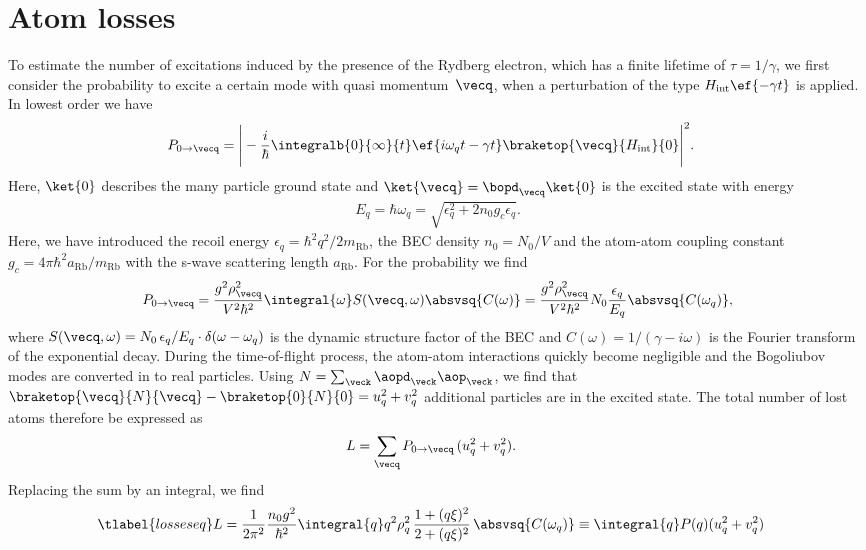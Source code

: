 \section{Atom losses}
To estimate the number of excitations induced by the presence of the Rydberg electron, which has a finite lifetime of $\tau=1/\gamma$, we first consider the probability to excite a certain mode with quasi momentum~$\vecq$, when a perturbation of the type $H_\text{int} \ef{-\gamma t}$ is applied. In lowest order we have
\begin{align}
P_{0\rightarrow\vecq}&=\Bigg|-\frac{i}{\hbar}\integralb{0}{\infty}{t}\ef{i\omega_{q}t-\gamma t}\braketop{\vecq}{H_\text{int}}{0}\Bigg|^2.
\end{align}
Here, $\ket{0}$ describes the many particle ground state and $\ket{\vecq}=\bopd_{\vecq}\ket{0}$ is the excited state with energy
\begin{align}
    E_{q}=\hbar\omega_{q}=\sqrt{\epsilon_{q}^2+2n_0g_c\epsilon_{q}}.
\end{align}
Here, we have introduced the recoil energy $\epsilon_{q}=\hbar^2 q^2/2m_\text{Rb}$, the BEC density $n_0=N_0/V$ and the atom-atom coupling constant $g_c=4\pi \hbar ^2a_{\text{Rb}}/m_{\text{Rb}}$ with the s-wave scattering length $a_{\text{Rb}}$.
For the probability we find
\begin{align}
P_{0\rightarrow\vecq}=\frac{g^2 \rho_{\vecq}^2 }{V^2\hbar^2}   \integral{\omega}S(\vecq,\omega)\absvsq{C(\omega)} = \frac{g^2 \rho_{\vecq}^2}{V^2\hbar^2} N_0 \frac{\epsilon_{q}}{E_{q}} \absvsq{C(\omega_q)},
\end{align}
where $S({\vecq},\omega)=N_0 \,\epsilon_{q}/E_{q} \cdot \delta(\omega-\omega_{q})$ is the dynamic structure factor of the BEC and $C(\omega)=1/(\gamma-i \omega)$ is the Fourier transform of the exponential decay.
During the time-of-flight process, the atom-atom interactions quickly become negligible and the Bogoliubov modes are converted in to real particles. Using $N=\sum_{\veck} \aopd_{\veck}\aop_{\veck}$, we find that $\braketop{\vecq}{N}{\vecq}-\braketop{0}{N}{0} = u_{q}^2+v_{q}^2$ additional particles are in the excited state. The total number of lost atoms therefore be expressed as
\begin{align}
L &= \sum_{\vecq} P_{0\rightarrow\vecq}\, (u_{q}^2+v_{q}^2).
\end{align}
Replacing the sum by an integral, we find
\begin{align} \tlabel{losseseq}
L&= \frac{1}{2\pi^2}\frac{n_0 g^2}{\hbar^2} \integral{q} q^2\rho_q^2\,\frac{1+(q\xi)^2}{2+(q\xi)^2} \, \absvsq{C(\omega_q)}  \equiv \integral{q} P(q) (u_{q}^2+v_{q}^2)
\end{align}
